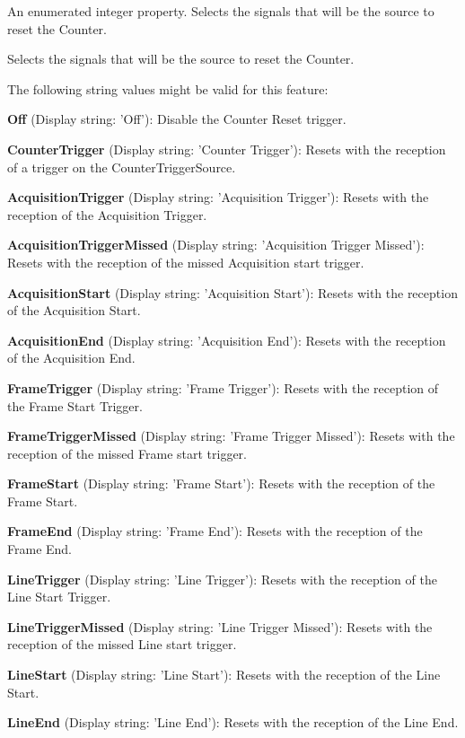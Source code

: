An enumerated integer property. Selects the signals that will be the source to reset the Counter. 

Selects the signals that will be the source to reset the Counter.

The following string values might be valid for this feature\+:
\begin{DoxyItemize}
\item {\bfseries Off} (Display string\+: 'Off')\+: Disable the Counter Reset trigger.
\item {\bfseries Counter\+Trigger} (Display string\+: 'Counter Trigger')\+: Resets with the reception of a trigger on the Counter\+Trigger\+Source.
\item {\bfseries Acquisition\+Trigger} (Display string\+: 'Acquisition Trigger')\+: Resets with the reception of the Acquisition Trigger.
\item {\bfseries Acquisition\+Trigger\+Missed} (Display string\+: 'Acquisition Trigger Missed')\+: Resets with the reception of the missed Acquisition start trigger.
\item {\bfseries Acquisition\+Start} (Display string\+: 'Acquisition Start')\+: Resets with the reception of the Acquisition Start.
\item {\bfseries Acquisition\+End} (Display string\+: 'Acquisition End')\+: Resets with the reception of the Acquisition End.
\item {\bfseries Frame\+Trigger} (Display string\+: 'Frame Trigger')\+: Resets with the reception of the Frame Start Trigger.
\item {\bfseries Frame\+Trigger\+Missed} (Display string\+: 'Frame Trigger Missed')\+: Resets with the reception of the missed Frame start trigger.
\item {\bfseries Frame\+Start} (Display string\+: 'Frame Start')\+: Resets with the reception of the Frame Start.
\item {\bfseries Frame\+End} (Display string\+: 'Frame End')\+: Resets with the reception of the Frame End.
\item {\bfseries Line\+Trigger} (Display string\+: 'Line Trigger')\+: Resets with the reception of the Line Start Trigger.
\item {\bfseries Line\+Trigger\+Missed} (Display string\+: 'Line Trigger Missed')\+: Resets with the reception of the missed Line start trigger.
\item {\bfseries Line\+Start} (Display string\+: 'Line Start')\+: Resets with the reception of the Line Start.
\item {\bfseries Line\+End} (Display string\+: 'Line End')\+: Resets with the reception of the Line End.

\end{DoxyItemize}
